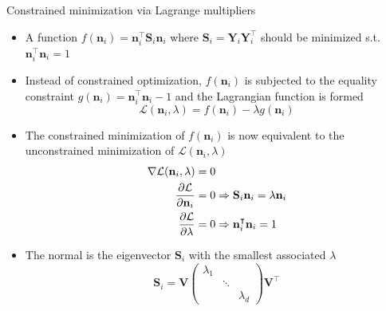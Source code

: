 \documentclass[xcolor=dvipsnames,10pt]{beamer}
\begin{document}
\begin{frame}{Constrained minimization via Lagrange multipliers}
    \begin{itemize}
        \item A function $f(\mathbf{n}_i) = \mathbf{n}_i^\intercal \mathbf{S}_i \mathbf{n}_i$ where $\mathbf{S}_i = \mathbf{Y}_i \mathbf{Y}_i^\intercal$ should be minimized s.t. $\mathbf{n}_i^\intercal \mathbf{n}_i = 1$
        \item Instead of constrained optimization, $f(\mathbf{n}_i)$ is subjected to the equality constraint $g(\mathbf{n}_i) = \mathbf{n}_i^\intercal \mathbf{n}_i - 1$ and the Lagrangian function is formed
        \begin{equation*}
            \mathcal{L}(\mathbf{n}_i, \lambda) = f(\mathbf{n}_i) - \lambda g(\mathbf{n}_i)
        \end{equation*}
        \item The constrained minimization of $f(\mathbf{n}_i)$ is now equivalent to the unconstrained minimization of $\mathcal{L}(\mathbf{n}_i, \lambda)$
        \begin{align*}
            \centering
            \nabla \mathcal{L}(\mathbf{n}_i, \lambda) &= 0 \\
            \frac{\partial \mathcal{L}}{\partial \mathbf{n}_i} &= 0 \Rightarrow \mathbf{S}_i \mathbf{n}_i = \lambda \mathbf{n}_i \\
            \frac{\partial \mathcal{L}}{\partial \lambda} &= 0 \Rightarrow \mathbf{n}_i^\intercal \mathbf{n}_i = 1
        \end{align*}
        \item The normal is the eigenvector $\mathbf{S}_i$ with the smallest associated $\lambda$
        \begin{equation*}
            \mathbf{S}_i = \mathbf{V} \begin{pmatrix}
            \lambda_1 &  &  \\
            & \ddots & \\
            & & \lambda_d
            \end{pmatrix} \mathbf{V}^\intercal
        \end{equation*}
    \end{itemize}
\end{frame}
\end{document}
